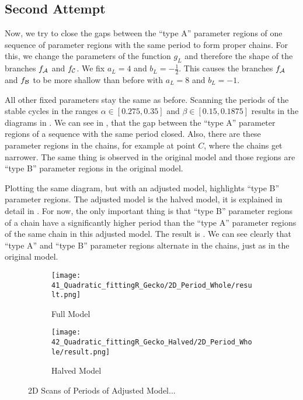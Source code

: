 \subsection{Second Attempt}

Now, we try to close the gaps between the ``type A'' parameter regions of one sequence of parameter regions with the same period to form proper chains.
For this, we change the parameters of the function $g_L$ and therefore the shape of the branches $f_{\mathcal{A}}$ and $f_{\mathcal{C}}$.
We fix $a_L = 4$ and $b_L = -\frac{1}{2}$.
This causes the branches $f_{\mathcal{A}}$ and $f_{\mathcal{B}}$ to be more shallow than before with $a_L = 8$ and $b_L = -1$.

All other fixed parameters stay the same as before.
Scanning the periods of the stable cycles in the ranges $\alpha \in [0.275, 0.35]$ and $\beta \in [0.15, 0.1875]$ results in the diagrams in .
We can see in , that the gap between the ``type A'' parameter regions of a sequence with the same period closed.
Also, there are these parameter regions in the chains, for example at point $C$, where the chains get narrower.
The same thing is observed in the original model and those regions are ``type B'' parameter regions in the original model.

Plotting the same diagram, but with an adjusted model, highlights ``type B'' parameter regions.
The adjusted model is the halved model, it is explained in detail in .
For now, the only important thing is that ``type B'' parameter regions of a chain have a significantly higher period than the ``type A'' parameter regions of the same chain in this adjusted model.
The result is .
We can see clearly that ``type A'' and ``type B'' parameter regions alternate in the chains, just as in the original model.

\begin{figure}
	\centering
	\begin{subfigure}{0.4\textwidth}
		\centering
		\texttt{[image: 41\_Quadratic\_fittingR\_Gecko/2D\_Period\_Whole/result.png]}
		\caption{Full Model}
		\label{fig:setup.quad.hyper.2.period.full}
	\end{subfigure}
	\begin{subfigure}{0.4\textwidth}
		\centering
		\texttt{[image: 42\_Quadratic\_fittingR\_Gecko\_Halved/2D\_Period\_Whole/result.png]}
		\caption{Halved Model}
		\label{fig:setup.quad.hyper.2.period.halved}
	\end{subfigure}
	\caption{2D Scans of Periods of Adjusted Model...}
	\label{fig:setup.quad.hyper.2.period}
\end{figure}

